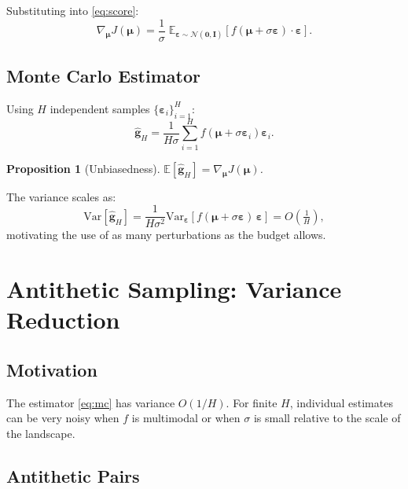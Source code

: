 \documentclass[12pt, a4paper]{article}
\newtheorem{proposition}[theorem]{Proposition}
\newcommand{\bmu}{\boldsymbol{\mu}}
\newcommand{\beps}{\boldsymbol{\varepsilon}}
\newcommand{\EE}{\mathbb{E}}
\newcommand{\Var}{\mathrm{Var}}
\newcommand{\NN}{\mathcal{N}}
\begin{document}
Substituting into \eqref{eq:score}:
\begin{equation}
  \nabla_{\bmu} J(\bmu)
  = \frac{1}{\sigma}\;
    \EE_{\beps \sim \NN(\mathbf{0},\mathbf{I})}
    \!\left[f\!\left(\bmu + \sigma\beps\right)\cdot\beps\right].
  \label{eq:gaussian_grad}
\end{equation}

\subsection{Monte Carlo Estimator}

Using $H$ independent samples $\{\beps_i\}_{i=1}^{H}$:
\begin{equation}
  \hat{\mathbf{g}}_H
  = \frac{1}{H\sigma}\sum_{i=1}^{H}
    f\!\left(\bmu + \sigma\beps_i\right)\beps_i.
  \label{eq:mc}
\end{equation}

\begin{proposition}[Unbiasedness]
  $\EE\!\left[\hat{\mathbf{g}}_H\right] = \nabla_{\bmu} J(\bmu)$.
\end{proposition}

\noindent
The variance scales as:
\begin{equation}
  \Var\!\left[\hat{\mathbf{g}}_H\right]
  = \frac{1}{H\sigma^2}
    \Var_{\beps}\!\left[f(\bmu+\sigma\beps)\,\beps\right]
  = O\!\left(\tfrac{1}{H}\right),
\end{equation}
motivating the use of as many perturbations as the budget allows.

\section{Antithetic Sampling: Variance Reduction}
\label{sec:antithetic}

\subsection{Motivation}

The estimator \eqref{eq:mc} has variance $O(1/H)$.
For finite $H$, individual estimates can be very noisy when $f$ is
multimodal or when $\sigma$ is small relative to the scale of the landscape.

\subsection{Antithetic Pairs}
\end{document}
